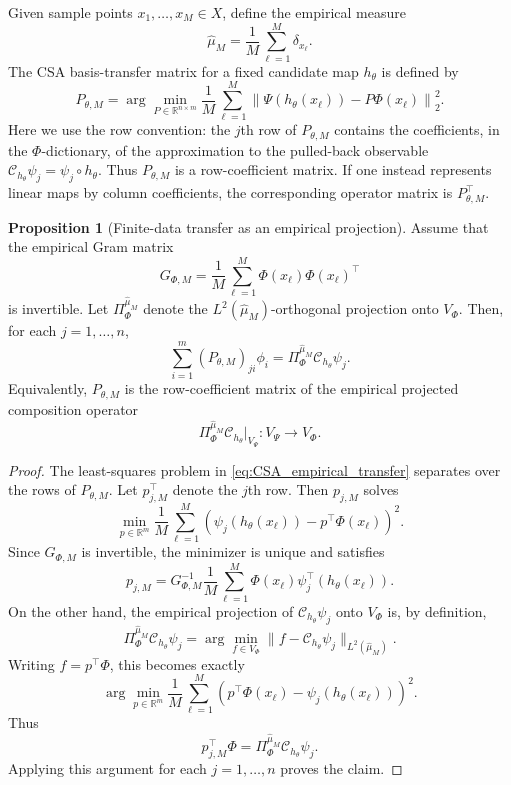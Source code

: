 \documentclass{article}
\theoremstyle{definition}
\newtheorem{proposition}{Proposition}
\begin{document}
Given sample points $x_1,\ldots,x_M\in X$, define the empirical measure
\[
\widehat\mu_M=\frac1M\sum_{\ell=1}^M\delta_{x_\ell}.
\]
The CSA basis-transfer matrix for a fixed candidate map $h_\theta$ is defined by
\begin{equation}
P_{\theta,M}
=
\arg\min_{P\in\mathbb R^{n\times m}}
\frac1M\sum_{\ell=1}^M
\left\|
\Psi(h_\theta(x_\ell))-P\Phi(x_\ell)
\right\|_2^2 .
\label{eq:CSA_empirical_transfer}
\end{equation}
Here we use the row convention: the $j$th row of $P_{\theta,M}$ contains the coefficients,
in the $\Phi$-dictionary, of the approximation to the pulled-back observable
$\mathcal C_{h_\theta}\psi_j=\psi_j\circ h_\theta$. Thus $P_{\theta,M}$ is a row-coefficient matrix.
If one instead represents linear maps by column coefficients, the corresponding operator
matrix is $P_{\theta,M}^\top$.

\begin{proposition}[Finite-data transfer as an empirical projection]
\label{prop:finite_data_transfer_projection}
Assume that the empirical Gram matrix
\[
G_{\Phi,M}
=
\frac1M\sum_{\ell=1}^M
\Phi(x_\ell)\Phi(x_\ell)^\top
\]
is invertible. Let $\Pi_\Phi^{\widehat\mu_M}$ denote the
$L^2(\widehat\mu_M)$-orthogonal projection onto $V_\Phi$. Then, for each
$j=1,\ldots,n$,
\[
\sum_{i=1}^m (P_{\theta,M})_{ji}\phi_i
=
\Pi_\Phi^{\widehat\mu_M} \mathcal C_{h_\theta}\psi_j .
\]
Equivalently, $P_{\theta,M}$ is the row-coefficient matrix of the empirical projected
composition operator
\[
\Pi_\Phi^{\widehat\mu_M} \mathcal C_{h_\theta}\big|_{V_\Psi}:V_\Psi\to V_\Phi .
\]
\end{proposition}

\begin{proof}
The least-squares problem in \eqref{eq:CSA_empirical_transfer} separates over the rows of
$P_{\theta,M}$. Let $p_{j,M}^\top$ denote the $j$th row. Then $p_{j,M}$ solves
\[
\min_{p\in\mathbb R^m}
\frac1M\sum_{\ell=1}^M
\left(
\psi_j(h_\theta(x_\ell))-p^\top\Phi(x_\ell)
\right)^2 .
\]
Since $G_{\Phi,M}$ is invertible, the minimizer is unique and satisfies
\[
p_{j,M}
=
G_{\Phi,M}^{-1}
\frac1M\sum_{\ell=1}^M
\Phi(x_\ell)\psi_j^\top(h_\theta(x_\ell)).
\]
On the other hand, the empirical projection of $\mathcal C_{h_\theta}\psi_j$ onto $V_\Phi$ is,
by definition,
\[
\Pi_\Phi^{\widehat\mu_M}\mathcal C_{h_\theta}\psi_j
=
\arg\min_{f\in V_\Phi}
\|f-\mathcal C_{h_\theta}\psi_j\|_{L^2(\widehat\mu_M)} .
\]
Writing $f=p^\top\Phi$, this becomes exactly
\[
\arg\min_{p\in\mathbb R^m}
\frac1M\sum_{\ell=1}^M
\left(
p^\top\Phi(x_\ell)-\psi_j(h_\theta(x_\ell))
\right)^2 .
\]
Thus
\[
p_{j,M}^\top\Phi
=
\Pi_\Phi^{\widehat\mu_M}\mathcal C_{h_\theta}\psi_j .
\]
Applying this argument for each $j=1,\ldots,n$ proves the claim.
\end{proof}
\end{document}
